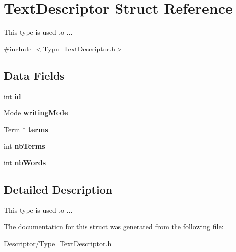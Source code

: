 \hypertarget{structTextDescriptor}{\section{Text\-Descriptor Struct Reference}
\label{structTextDescriptor}
}


This type is used to ...  




{\ttfamily \#include $<$Type\-\_\-\-Text\-Descriptor.\-h$>$}

\subsection*{Data Fields}
\begin{DoxyCompactItemize}
\item 
\hypertarget{structTextDescriptor_a64b3b9394a19800e449595029c15ded5}{int {\bfseries id}}\label{structTextDescriptor_a64b3b9394a19800e449595029c15ded5}

\item 
\hypertarget{structTextDescriptor_a27a620a215c6af07994aae14e737751e}{\hyperlink{Type__WritingMode_8h_a46c8a310cf4c094f8c80e1cb8dc1f911}{Mode} {\bfseries writing\-Mode}}\label{structTextDescriptor_a27a620a215c6af07994aae14e737751e}

\item 
\hypertarget{structTextDescriptor_afbfbed316f2c8b9e0ea632afbba1e884}{\hyperlink{structTerm}{Term} $\ast$ {\bfseries terms}}\label{structTextDescriptor_afbfbed316f2c8b9e0ea632afbba1e884}

\item 
\hypertarget{structTextDescriptor_a3a600cb401ae424ce3a565731be5785d}{int {\bfseries nb\-Terms}}\label{structTextDescriptor_a3a600cb401ae424ce3a565731be5785d}

\item 
\hypertarget{structTextDescriptor_adc0fb0281feb53f9acf6c767654156a9}{int {\bfseries nb\-Words}}\label{structTextDescriptor_adc0fb0281feb53f9acf6c767654156a9}

\end{DoxyCompactItemize}


\subsection{Detailed Description}
This type is used to ... 

The documentation for this struct was generated from the following file\-:\begin{DoxyCompactItemize}
\item 
Descriptor/\hyperlink{Type__TextDescriptor_8h}{Type\-\_\-\-Text\-Descriptor.\-h}\end{DoxyCompactItemize}
